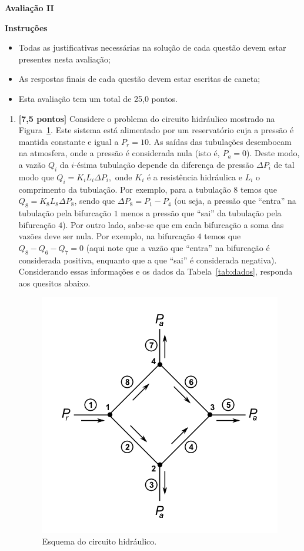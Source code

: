 \documentclass[12pt,a4paper]{article}
\begin{document}
\begin{center}
 \textbf{Avaliação II}
\end{center}

\textbf{Instruções}
\begin{itemize}
 \item Todas as justificativas necessárias na solução de cada questão devem estar presentes nesta avaliação;
 \item As respostas finais de cada questão devem estar escritas de caneta;
 \item Esta avaliação tem um total de 25,0 pontos.
\end{itemize}

\begin{enumerate}
 \item \textbf{[7,5 pontos]} Considere o problema do circuito hidráulico mostrado na Figura~\ref{fig:tub}. Este sistema está alimentado por 
um reservatório cuja a pressão é mantida constante e igual a $P_r = 10$. As saídas das tubulações desembocam na atmosfera, onde a pressão é 
considerada nula (isto é, $P_a = 0$). Deste modo, a vazão $Q_i$ da $i$-ésima tubulação depende da diferença de pressão $\Delta P_i$ 
de tal modo que $Q_i = K_iL_i\Delta P_i,$ onde $K_i$ é a resistência hidráulica e $L_i$ o comprimento da tubulação. Por exemplo, para a 
tubulação $8$ temos que $Q_8 = K_8L_8\Delta P_8$, sendo que $\Delta P_8 = P_1 - P_4$ (ou seja, a pressão que ``entra'' na tubulação pela 
bifurcação $1$ menos a pressão que ``sai'' da tubulação pela bifurcação $4$). Por outro lado, sabe-se que em cada bifurcação a soma das vazões 
deve ser nula. Por exemplo, na bifurcação $4$ temos que $Q_8 - Q_6 - Q_7 = 0$ (aqui note que a vazão que ``entra'' na bifurcação é considerada positiva, 
enquanto que a que ``sai'' é considerada negativa). Considerando essas informações e os dados da Tabela~\ref{tab:dados}, responda aos quesitos abaixo.

\begin{figure}[H]
 \centering
 \includegraphics[scale=0.7]{imagem/Tubulacao.png}
 \caption{Esquema do circuito hidráulico.}
 \label{fig:tub}
\end{figure}


\end{enumerate}
\end{document}
